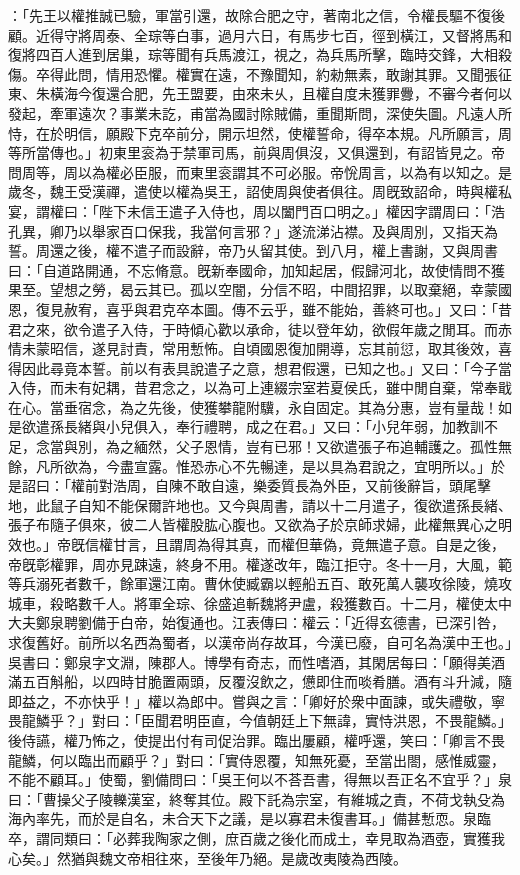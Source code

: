 \begin{pinyinscope}
：「先王以權推誠已驗，軍當引還，故除合肥之守，著南北之信，令權長驅不復後顧。近得守將周泰、全琮等白事，過月六日，有馬步七百，徑到橫江，又督將馬和復將四百人進到居巢，琮等聞有兵馬渡江，視之，為兵馬所擊，臨時交鋒，大相殺傷。卒得此問，情用恐懼。權實在遠，不豫聞知，約勑無素，敢謝其罪。又聞張征東、朱橫海今復還合肥，先王盟要，由來未乆，且權自度未獲罪釁，不審今者何以發起，牽軍遠次？事業未訖，甫當為國討除賊備，重聞斯問，深使失圖。凡遠人所恃，在於明信，願殿下克卒前分，開示坦然，使權誓命，得卒本規。凡所願言，周等所當傳也。」初東里衮為于禁軍司馬，前與周俱沒，又俱還到，有詔皆見之。帝問周等，周以為權必臣服，而東里衮謂其不可必服。帝恱周言，以為有以知之。是歲冬，魏王受漢禪，遣使以權為吳王，詔使周與使者俱往。周旣致詔命，時與權私宴，謂權曰：「陛下未信王遣子入侍也，周以闔門百口明之。」權因字謂周曰：「浩孔異，卿乃以舉家百口保我，我當何言邪？」遂流涕沾襟。及與周別，又指天為誓。周還之後，權不遣子而設辭，帝乃乆留其使。到八月，權上書謝，又與周書曰：「自道路開通，不忘脩意。旣新奉國命，加知起居，假歸河北，故使情問不獲果至。望想之勞，曷云其已。孤以空闇，分信不昭，中間招罪，以取棄絕，幸蒙國恩，復見赦宥，喜乎與君克卒本圖。傳不云乎，雖不能始，善終可也。」又曰：「昔君之來，欲令遣子入侍，于時傾心歡以承命，徒以登年幼，欲假年歲之閒耳。而赤情未蒙昭信，遂見討責，常用慙怖。自頃國恩復加開導，忘其前愆，取其後效，喜得因此尋竟本誓。前以有表具說遣子之意，想君假還，已知之也。」又曰：「今子當入侍，而未有妃耦，昔君念之，以為可上連綴宗室若夏侯氏，雖中閒自棄，常奉戢在心。當垂宿念，為之先後，使獲攀龍附驥，永自固定。其為分惠，豈有量哉！如是欲遣孫長緒與小兒俱入，奉行禮聘，成之在君。」又曰：「小兒年弱，加教訓不足，念當與別，為之緬然，父子恩情，豈有已邪！又欲遣張子布追輔護之。孤性無餘，凡所欲為，今盡宣露。惟恐赤心不先暢達，是以具為君說之，宜明所以。」於是詔曰：「權前對浩周，自陳不敢自遠，樂委質長為外臣，又前後辭旨，頭尾擊地，此鼠子自知不能保爾許地也。又今與周書，請以十二月遣子，復欲遣孫長緒、張子布隨子俱來，彼二人皆權股肱心腹也。又欲為子於京師求婦，此權無異心之明效也。」帝旣信權甘言，且謂周為得其真，而權但華偽，竟無遣子意。自是之後，帝旣彰權罪，周亦見踈遠，終身不用。權遂改年，臨江拒守。冬十一月，大風，範等兵溺死者數千，餘軍還江南。曹休使臧霸以輕船五百、敢死萬人襲攻徐陵，燒攻城車，殺略數千人。將軍全琮、徐盛追斬魏將尹盧，殺獲數百。十二月，權使太中大夫鄭泉聘劉備于白帝，始復通也。江表傳曰：權云：「近得玄德書，已深引咎，求復舊好。前所以名西為蜀者，以漢帝尚存故耳，今漢已廢，自可名為漢中王也。」吳書曰：鄭泉字文淵，陳郡人。博學有奇志，而性嗜酒，其閑居每曰：「願得美酒滿五百斛船，以四時甘脆置兩頭，反覆沒飲之，憊即住而啖肴膳。酒有斗升減，隨即益之，不亦快乎！」權以為郎中。嘗與之言：「卿好於衆中面諫，或失禮敬，寧畏龍鱗乎？」對曰：「臣聞君明臣直，今值朝廷上下無諱，實恃洪恩，不畏龍鱗。」後侍讌，權乃怖之，使提出付有司促治罪。臨出屢顧，權呼還，笑曰：「卿言不畏龍鱗，何以臨出而顧乎？」對曰：「實侍恩覆，知無死憂，至當出閤，感惟威靈，不能不顧耳。」使蜀，劉備問曰：「吳王何以不荅吾書，得無以吾正名不宜乎？」泉曰：「曹操父子陵轢漢室，終奪其位。殿下託為宗室，有維城之責，不荷戈執殳為海內率先，而於是自名，未合天下之議，是以寡君未復書耳。」備甚慙恧。泉臨卒，謂同類曰：「必葬我陶家之側，庶百歲之後化而成土，幸見取為酒壺，實獲我心矣。」然猶與魏文帝相往來，至後年乃絕。是歲改夷陵為西陵。


\end{pinyinscope}
